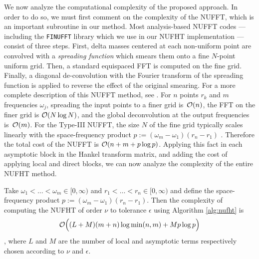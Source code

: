 We now analyze the computational complexity of the proposed approach. In order
to do so, we must first comment on the complexity of the NUFFT, which is an
important subroutine in our method. Most analysis-based NUFFT codes ---
including the \texttt{FINUFFT} library \cite{barnett2019parallel} which we use
in our NUFHT implementation --- consist of three steps. First, delta masses
centered at each non-uniform point are convolved with a \textit{spreading
  function} which smears them onto a fine $N$-point uniform grid. Then, a
standard equispaced FFT is computed on the fine grid. Finally, a diagonal
de-convolution with the Fourier transform of the spreading function is applied
to reverse the effect of the original smearing. For a more complete description
of this NUFFT method, see
\cite{dutt1993fast,greengard2004accelerating,barnett2019parallel}.  For $n$
points $r_k$ and $m$ frequencies $\omega_j$, spreading the input points to a
finer grid
is~$\mathcal{O}(n)$, the FFT on the finer grid
is $\mathcal{O}(N\log N)$, and the global deconvolution at the output frequencies
is~$\mathcal{O}(m)$. For the Type-III NUFFT, the size $N$ of the fine grid typically
scales linearly with the space-frequency product
$p := (\omega_m - \omega_1)(r_n - r_1)$ \cite{barnett2019parallel,
  greengard2004accelerating}. Therefore the total cost of the NUFFT is
$\mathcal{O}(n + m + p\log p)$. Applying this fact in each asymptotic block in the
Hankel transform matrix, and adding the cost of applying local and direct
blocks, we can now analyze the complexity of the entire NUFHT method.

\begin{theorem} \label{thm:complexity} Take $\omega_1 < \dots < \omega_m \in
    [0,\infty)$ and $r_1 < \dots < r_n \in [0,\infty)$ and define the
    space-frequency product $p := (\omega_m - \omega_1)(r_n - r_1)$. Then the
    complexity of computing the NUFHT of order $\nu$ to tolerance $\epsilon$
    using Algorithm \ref{alg:nufht} is 
    $$\mathcal{O}\Big((L + M)(m + n) \log \min(n,m) + Mp\log p\Big)$$, where $L$ and $M$
    are the number of local and asymptotic terms respectively chosen according
    to $\nu$ and $\epsilon$.
\end{theorem}

